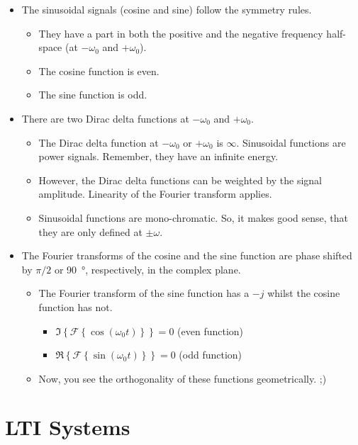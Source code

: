 \begin{refsection}
\begin{itemize}
	\item The sinusoidal signals (cosine and sine) follow the symmetry rules.
	\begin{itemize}
		\item They have a part in both the positive and the negative frequency half-space (at $- \omega_0$ and $+ \omega_0$).
		\item The cosine function is even.
		\item The sine function is odd.
	\end{itemize}
	\item There are two Dirac delta functions at $- \omega_0$ and $+ \omega_0$.
	\begin{itemize}
		\item The Dirac delta function at $- \omega_0$ or $+ \omega_0$ is $\infty$. Sinusoidal functions are power signals. Remember, they have an infinite energy.
		\item However, the Dirac delta functions can be weighted by the signal amplitude. Linearity of the Fourier transform applies.
		\item Sinusoidal functions are mono-chromatic. So, it makes good sense, that they are only defined at $\pm \omega$.
	\end{itemize}
	\item The Fourier transforms of the cosine and the sine function are phase shifted by $\pi/2$ or \SI{90}{\degree}, respectively, in the complex plane.
	\begin{itemize}
		\item The Fourier transform of the sine function has a $-j$ whilst the cosine function has not.
		\begin{itemize}
			\item $\Im\left\{\mathcal{F} \left\{\cos\left(\omega_0 t\right)\right\}\right\} = 0$ (even function)
			\item $\Re\left\{\mathcal{F} \left\{\sin\left(\omega_0 t\right)\right\}\right\} = 0$ (odd function)
		\end{itemize}
		\item Now, you see the orthogonality of these functions geometrically. ;)
	\end{itemize}
\end{itemize}


\section{\acs{LTI} Systems}


\end{refsection}
